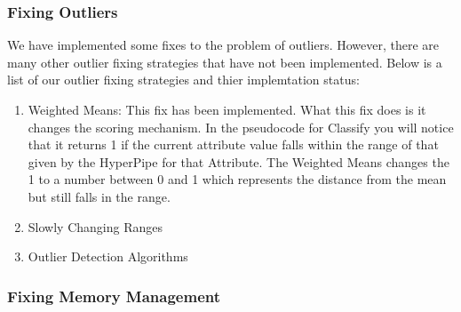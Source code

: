 \subsubsection{Fixing Outliers}
We have implemented some fixes to the problem of outliers. 
However, there are many other outlier fixing strategies that have 
not been implemented. Below is a list of our outlier fixing 
strategies and thier implemtation status:
\begin{enumerate}
\item Weighted Means: This fix has been implemented. What this fix 
does is it changes the scoring mechanism. In the pseudocode for 
Classify you will notice that it returns 1 if the current attribute 
value falls within the range of that given by the HyperPipe for that 
Attribute. The Weighted Means changes the 1 to a number between 0 
and 1 which represents the distance from the mean but still falls 
in the range.
\item Slowly Changing Ranges
\item Outlier Detection Algorithms
\end{enumerate}
\subsubsection{Fixing Memory Management}
